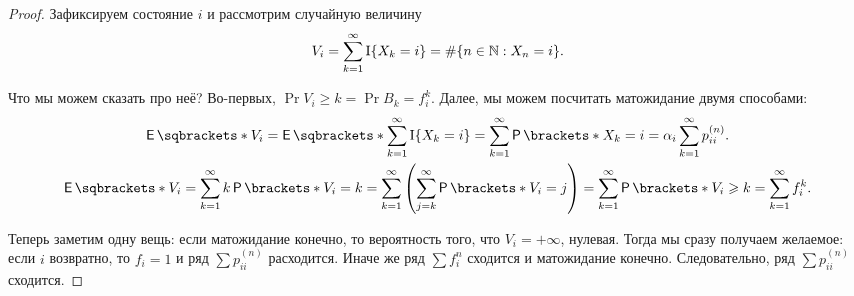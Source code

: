 \begin{proof}
	Зафиксируем состояние \(i\) и рассмотрим случайную величину
	\[
		V_{i} = \sum_{k = 1}^{\infty} \operatorname{\mathrm{I}}\{X_{k} = i\} = \#\{n \in \mathbb{N} : X_{n} = 
		i\}.
	\]
	
	Что мы можем сказать про неё? Во-первых, \(\Pr{V_{i} \geq k} = \Pr{B_{k}} = 
	f_{i}^{k}\). Далее, мы можем посчитать матожидание двумя способами:
	\begin{gather}
		\E{V_{i}} = \E{\sum_{k = 1}^{\infty} \I\{X_{k} = i\}} = \sum_{k = 
		1}^{\infty} \Pr{X_{k} = i}  = \alpha_{i}\sum_{k = 1}^{\infty} 
		p_{ii}^{(n)}. \\
		\E{V_{i}} = \sum_{k = 1}^{\infty} k\Pr{V_{i} = k} = \sum_{k = 
		1}^{\infty} \left(\sum_{j = k}^{\infty} \Pr{V_{i} = j}\right) = \sum_{k 
		= 1}^{\infty} \Pr{V_{i} \geq k} = \sum_{k = 1}^{\infty} f_{i}^{k}.
	\end{gather}
	
	Теперь заметим одну вещь: если матожидание конечно, то вероятность того, 
	что \(V_{i} = +\infty\), нулевая. Тогда мы сразу получаем желаемое: если 
	\(i\) возвратно, то \(f_{i} = 1\) и ряд \(\sum p_{ii}^{(n)}\) расходится. 
	Иначе же ряд \(\sum f_{i}^{n}\) сходится и матожидание конечно. 
	Следовательно, ряд \(\sum p_{ii}^{(n)}\) сходится.
\end{proof}

